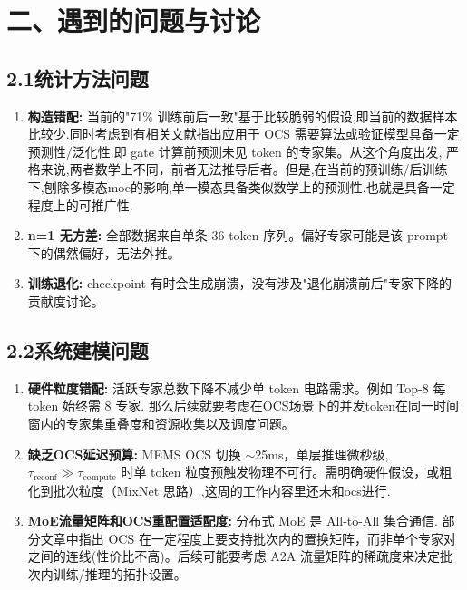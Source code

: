 \documentclass{sjtuweekly}
\begin{document}
\section{二、遇到的问题与讨论}

\subsection*{2.1\quad 统计方法问题}

\begin{enumerate}[label=(\arabic*), leftmargin=*]
  \item \textbf{构造错配:} 当前的"71\% 训练前后一致"基于比较脆弱的假设,即当前的数据样本比较少.同时考虑到有相关文献指出应用于 OCS 需要算法或验证模型具备一定预测性/泛化性.即 gate 计算前预测未见 token 的专家集。从这个角度出发, 严格来说,两者数学上不同，前者无法推导后者。但是,在当前的预训练/后训练下,刨除多模态moe的影响,单一模态具备类似数学上的预测性.也就是具备一定程度上的可推广性.
  \item \textbf{n=1 无方差:} 全部数据来自单条 36-token 序列。偏好专家可能是该 prompt 下的偶然偏好，无法外推。
  \item \textbf{训练退化:} checkpoint 有时会生成崩溃，没有涉及"退化崩溃前后"专家下降的贡献度讨论。
\end{enumerate}

\subsection*{2.2\quad 系统建模问题}

\begin{enumerate}[label=(\arabic*), leftmargin=*]
  \item \textbf{硬件粒度错配:} 活跃专家总数下降不减少单 token 电路需求。例如 Top-8 每 token 始终需 8 专家. 那么后续就要考虑在OCS场景下的并发token在同一时间窗内的专家集重叠度和资源收集以及调度问题。
  \item \textbf{缺乏OCS延迟预算:} MEMS OCS 切换 $\sim$25ms，单层推理微秒级, $\tau_{\text{reconf}} \gg \tau_{\text{compute}}$ 时单 token 粒度预触发物理不可行。需明确硬件假设，或粗化到批次粒度（MixNet 思路）,这周的工作内容里还未和ocs进行.
  \item \textbf{MoE流量矩阵和OCS重配置适配度:} 分布式 MoE 是 All-to-All 集合通信. 部分文章中指出 OCS 在一定程度上要支持批次内的置换矩阵，而非单个专家对之间的连线(性价比不高)。后续可能要考虑 A2A 流量矩阵的稀疏度来决定批次内训练/推理的拓扑设置。

\end{enumerate}
\end{document}
